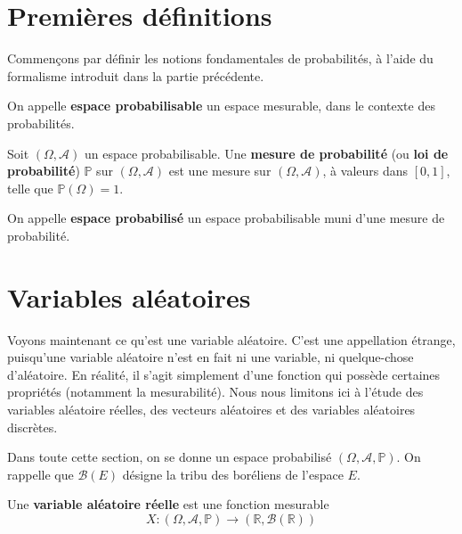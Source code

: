 \documentclass[../integ-proba.tex]{subfiles}
\begin{document}
\section{Premières définitions}

Commençons par définir les notions fondamentales de probabilités, à l'aide du formalisme introduit dans la partie précédente.

\begin{defi}
    On appelle \textbf{espace probabilisable} un espace mesurable, dans le contexte des probabilités.
\end{defi}

\begin{defi}
    Soit $\left(\Omega, \mathcal{A}\right)$ un espace probabilisable.
    Une \textbf{mesure de probabilité} (ou \textbf{loi de probabilité}) $\mathbb{P}$ sur $\left(\Omega, \mathcal{A}\right)$ est une mesure sur $\left(\Omega, \mathcal{A}\right)$, à valeurs dans $\left[0,1\right]$, telle que $\mathbb{P}\left(\Omega\right)=1$.
\end{defi}

\begin{defi}
    On appelle \textbf{espace probabilisé} un espace probabilisable muni d'une mesure de probabilité.
\end{defi}

\section{Variables aléatoires}

Voyons maintenant ce qu'est une variable aléatoire.
C'est une appellation étrange, puisqu'une variable aléatoire n'est en fait ni une variable, ni quelque-chose d'aléatoire.
En réalité, il s'agit simplement d'une fonction qui possède certaines propriétés (notamment la mesurabilité).
Nous nous limitons ici à l'étude des variables aléatoire réelles, des vecteurs aléatoires et des variables aléatoires discrètes.

Dans toute cette section, on se donne un espace probabilisé $\left(\Omega, \mathcal{A}, \mathbb{P}\right)$.
On rappelle que $\mathcal{B}(E)$ désigne la tribu des boréliens de l'espace $E$.

\begin{defi}
    Une \textbf{variable aléatoire réelle} est une fonction mesurable
    $$X:\left(\Omega, \mathcal{A}, \mathbb{P}\right) \longrightarrow \left(\mathbb{R}, \mathcal{B}(\mathbb{R})\right)$$
\end{defi}
\end{document}
